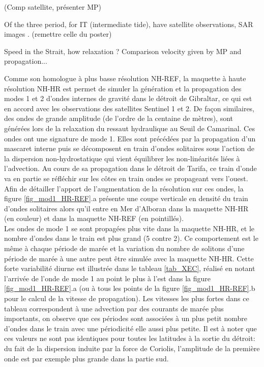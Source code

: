 (Comp satellite, présenter MP)

Of the three period, for IT (intermediate tide), have satellite observations, SAR images . (remettre celle du poster)



Speed in the Strait, how relaxation ? Comparison velocity given by MP and propagation...


Comme son homologue à plus basse résolution NH-REF, la maquette à haute résolution NH-HR est permet de simuler la génération et la propagation des modes 1 et 2 d'ondes internes de gravité dans le détroit de Gibraltar, ce qui est en accord avec les observations des satellites Sentinel 1 et 2. De façon similaires, des ondes de grande amplitude (de l'ordre de la centaine de mètres), sont générées lors de la relaxation du ressaut hydraulique au Seuil de Camarinal. Ces ondes ont une signature de mode 1. Elles sont précédées par la propagation d'un mascaret interne puis se décomposent en train d'ondes solitaires sous l'action de la dispersion non-hydrostatique qui vient équilibrer les non-linéarités liées à l'advection. Au cours de sa propagation dans le détroit de Tarifa, ce train d'onde va en partie se réfléchir sur les côtes en train ondes se propageant vers l'ouest. Afin de détailler l'apport de l'augmentation de la résolution sur ces ondes, la figure \ref{fig_mod1_HR-REF}.a présente une coupe verticale en densité du train d'ondes solitaires alors qu'il entre en Mer d'Alboran dans la maquette NH-HR (en couleur) et dans la maquette NH-REF (en pointillés). \\
Les ondes de mode 1 se sont propagées plus vite dans la maquette NH-HR, et le nombre d'ondes dans le train est plus grand (5 contre 2). Ce comportement est le même à chaque période de marée et la variation du nombre de solitons d'une période de marée à une autre peut être simulée avec la maquette NH-HR. Cette forte variabilité diurne est illustrée dans le tableau \ref{tab_XEC}, réalisé en notant l'arrivée de l'onde de mode 1 au point le plus à l'est dans la figure \ref{fig_mod1_HR-REF}.a (ou à tous les points de la figure \ref{fig_mod1_HR-REF}.b pour le calcul de la vitesse de propagation). Les vitesses les plus fortes dans ce tableau correspondent à une advection par des courants de marée plus importants, on observe que ces périodes sont associées à un plus petit nombre d'ondes dans le train avec une périodicité elle aussi plus petite. Il est à noter que ces valeurs ne sont pas identiques pour toutes les latitudes à la sortie du détroit: du fait de la dispersion induite par la force de Coriolis, l'amplitude de la première onde est par exemple plus grande dans la partie sud.








